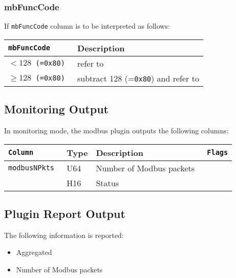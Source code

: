 \documentclass[documentation]{subfiles}
\begin{document}
\subsubsection{mbFuncCode}\label{mbFuncCode}
If {\tt mbFuncCode} column is to be interpreted as follows:
\begin{longtable}{>{\tt}ll}
    \toprule
    {\bf mbFuncCode} & {\bf Description}\\
    \midrule\endhead%
    $< 128$ (=0x80)    & refer to \nameref{modbusFC}\\
    $\geq 128$ (=0x80) & subtract 128 (={\tt 0x80}) and refer to \nameref{modbusFEx}\\
    \bottomrule
\end{longtable}

\subsection{Monitoring Output}
In monitoring mode, the modbus plugin outputs the following columns:
\begin{longtable}{>{\tt}lll>{\tt\small}l}
    \toprule
    {\bf Column} & {\bf Type} & {\bf Description} & {\bf Flags}\\
    \midrule\endhead%
    modbusNPkts          & U64 & Number of Modbus packets & \\
    \nameref{modbusStat} & H16 & Status                   & \\
    \bottomrule
\end{longtable}

\subsection{Plugin Report Output}
The following information is reported:
\begin{itemize}
    \item Aggregated {\tt{}}
    \item Number of Modbus packets
\end{itemize}
\end{document}
